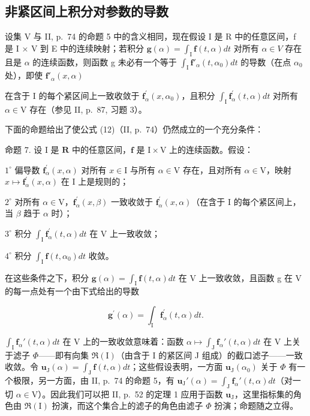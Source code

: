 \subsection{非紧区间上积分对参数的导数}

设集 V 与 II, p.~74 的命题 5 中的含义相同，现在假设 I 是 R 中的任意区间，f 是 I × V 到 E 中的连续映射；若积分 \(\mathbf{g}(\alpha) = \int_{\mathrm{I}} \mathbf{f}(t, \alpha) dt\) 对所有 \(\alpha \in V\) 存在且是 \(\alpha\) 的连续函数，则函数 g 未必有一个等于 \(\int_{\mathrm{I}} \mathbf{f}'_{\alpha}(t, \alpha_0) dt\) 的导数（在点 \(\alpha_0\) 处），即使 \(\mathbf{f}'_{\alpha}(x, \alpha)\)

在含于 I 的每个紧区间上一致收敛于 \(\mathbf{f}_{\alpha}^{\prime}(x,\alpha_{0})\)，且积分 \(\int_{\mathrm{I}}\mathbf{f}_{\alpha}^{\prime}(t,\alpha)dt\) 对所有 \(\alpha \in \mathrm{V}\) 存在（参见 II, p.~87, 习题 3）。

下面的命题给出了使公式 (12)（II, p.~74）仍然成立的一个充分条件：

命题 7. 设 I 是 \(\mathbf{R}\) 中的任意区间，\(\mathbf{f}\) 是 \(\mathrm{I} \times \mathrm{V}\) 上的连续函数。假设：

\(1^{\circ}\) 偏导数 \(\mathbf{f}_{\alpha}^{\prime}(x,\alpha)\) 对所有 \(x\in \mathrm{I}\) 与所有 \(\alpha \in \mathrm{V}\) 存在，且对所有 \(\alpha \in \mathrm{V}\)，映射 \(x\mapsto \mathbf{f}_{\alpha}^{\prime}(x,\alpha)\) 在 \(\mathrm{I}\) 上是规则的；

\(2^{\circ}\) 对所有 \(\alpha \in \mathrm{V}\)，\(\mathbf{f}_{\alpha}^{\prime}(x,\beta)\) 一致收敛于 \(\mathbf{f}_{\alpha}^{\prime}(x,\alpha)\)（在含于 I 的每个紧区间上，当 \(\beta\) 趋于 \(\alpha\) 时）；

\(3^{\circ}\) 积分 \(\int_{\mathrm{I}}\mathbf{f}_{\alpha}^{\prime}(t,\alpha)dt\) 在 \(\mathrm{V}\) 上一致收敛；

\(4^{\circ}\) 积分 \(\int_{\mathrm{I}}\mathbf{f}(t,\alpha_0)dt\) 收敛。

在这些条件之下，积分 \(\mathbf{g}(\alpha)=\int_{\mathrm{I}}\mathbf{f}(t,\alpha)dt\) 在 V 上一致收敛，且函数 g 在 V 的每一点处有一个由下式给出的导数

\[
\mathbf {g} ^ {\prime} (\alpha) = \int_ {\mathrm{I}} \mathbf {f} _ {\alpha} ^ {\prime} (t, \alpha) d t.\tag{14}
\]

\(\int_{\mathrm{I}} \mathbf{f}_{\alpha}'(t, \alpha) dt\) 在 V 上的一致收敛意味着：函数 \(\alpha \mapsto \int_{\mathrm{J}} \mathbf{f}_{\alpha}'(t, \alpha) dt\) 在 V 上关于滤子 \(\Phi\)——即有向集 \(\Re(\mathrm{I})\)（由含于 I 的紧区间 J 组成）的截口滤子——一致收敛。令 \(\mathbf{u}_{\mathrm{J}}(\alpha) = \int_{\mathrm{J}} \mathbf{f}(t, \alpha) dt\)；这些假设表明，一方面 \(\mathbf{u}_{\mathrm{J}}(\alpha_0)\) 关于 \(\Phi\) 有一个极限，另一方面，由 II, p.~74 的命题 5，有 \(\mathbf{u}_{\mathrm{J}}'(\alpha) = \int_{\mathrm{J}} \mathbf{f}_{\alpha}'(t, \alpha) dt\)（对一切 \(\alpha \in \mathrm{V}\)）。因此我们可以把 II, p.~52 的定理 1 应用于函数 \(\mathbf{u}_{\mathrm{J}}\)，这里指标集的角色由 \(\Re(\mathrm{I})\) 扮演，而这个集合上的滤子的角色由滤子 \(\Phi\) 扮演；命题随之立得。

